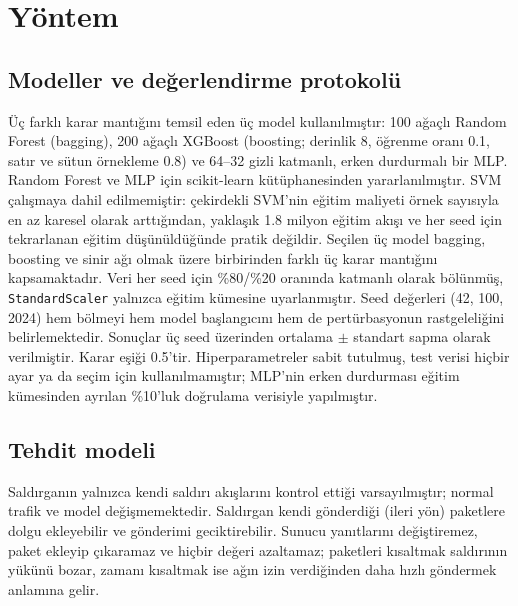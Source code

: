 \documentclass[conference]{IEEEtran}
\begin{document}
\section{Yöntem}

\subsection{Modeller ve değerlendirme protokolü}
Üç farklı karar mantığını temsil eden üç model kullanılmıştır: 100 ağaçlı Random Forest (bagging), 200 ağaçlı XGBoost \cite{chen2016} (boosting; derinlik 8, öğrenme oranı 0.1, satır ve sütun örnekleme 0.8) ve 64--32 gizli katmanlı, erken durdurmalı bir MLP. Random Forest ve MLP için scikit-learn \cite{pedregosa2011} kütüphanesinden yararlanılmıştır. SVM çalışmaya dahil edilmemiştir: çekirdekli SVM'nin eğitim maliyeti örnek sayısıyla en az karesel olarak arttığından, yaklaşık 1.8 milyon eğitim akışı ve her seed için tekrarlanan eğitim düşünüldüğünde pratik değildir. Seçilen üç model bagging, boosting ve sinir ağı olmak üzere birbirinden farklı üç karar mantığını kapsamaktadır. Veri her seed için \%80/\%20 oranında katmanlı olarak bölünmüş, \texttt{StandardScaler} yalnızca eğitim kümesine uyarlanmıştır. Seed değerleri (42, 100, 2024) hem bölmeyi hem model başlangıcını hem de pertürbasyonun rastgeleliğini belirlemektedir. Sonuçlar üç seed üzerinden ortalama $\pm$ standart sapma olarak verilmiştir. Karar eşiği 0.5'tir. Hiperparametreler sabit tutulmuş, test verisi hiçbir ayar ya da seçim için kullanılmamıştır; MLP'nin erken durdurması eğitim kümesinden ayrılan \%10'luk doğrulama verisiyle yapılmıştır.

\subsection{Tehdit modeli}
Saldırganın yalnızca kendi saldırı akışlarını kontrol ettiği varsayılmıştır; normal trafik ve model değişmemektedir. Saldırgan kendi gönderdiği (ileri yön) paketlere dolgu ekleyebilir ve gönderimi geciktirebilir. Sunucu yanıtlarını değiştiremez, paket ekleyip çıkaramaz ve hiçbir değeri azaltamaz; paketleri kısaltmak saldırının yükünü bozar, zamanı kısaltmak ise ağın izin verdiğinden daha hızlı göndermek anlamına gelir.
\end{document}
